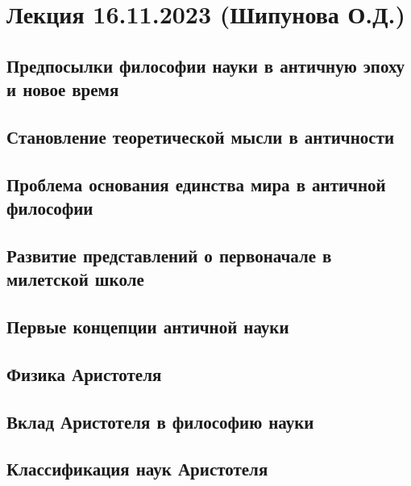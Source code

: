 \documentclass[main.tex]{subfiles}
\begin{document}
\section{Лекция 16.11.2023 (Шипунова О.Д.)}


\subsection{Предпосылки философии науки в античную эпоху и новое время}


\subsection{Становление теоретической мысли в античности}


\subsection{Проблема основания единства мира в античной философии}


\subsection{Развитие представлений о первоначале в милетской школе}


\subsection{Первые концепции античной науки}


\subsection{Физика Аристотеля}


\subsection{Вклад Аристотеля в философию науки}


\subsection{Классификация наук Аристотеля}
\end{document}
